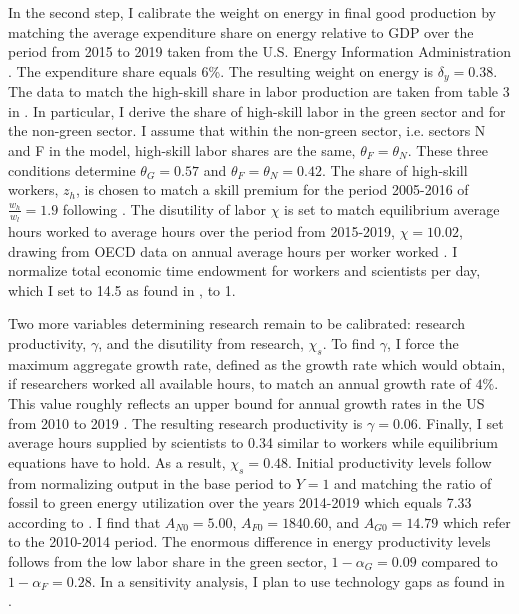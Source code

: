 In the second step, I calibrate the weight on energy in final good production by matching the average expenditure share on energy relative to GDP over the period from 2015 to 2019 taken from the U.S. Energy Information Administration \citep[][Table 1.7]{EIAEnergy}. The expenditure share equals 6\%. The resulting weight on energy is $\delta_y=0.38$. %
 The data to match the high-skill share in labor production are taken from table 3 in \cite{Consoli2016DoCapital}. In particular, I derive the share of high-skill labor in the green sector and for the non-green sector. I assume that within the non-green sector, i.e. sectors N and F in the model, high-skill labor shares are the same, $\theta_F=\theta_N$.  These three conditions determine $\theta_G=0.57$ and $\theta_F=\theta_N=0.42$. The share of high-skill workers, $z_h$, is chosen to match a skill premium for the period 2005-2016 of $\frac{w_h}{w_l}=1.9$ following \cite{Slavik2020WagePremium}. The disutility of labor $\chi$ is set to match equilibrium average hours worked to average hours over the period from 2015-2019, $\chi=10.02$, drawing from OECD data on annual average hours per worker worked \citep{OECDHoursworked}. I normalize total economic time endowment for workers and scientists per day, which I set to 14.5 as found in \cite{Jones1993OptimalGrowth}, to 1. 

 Two more variables determining research remain to be calibrated: research productivity, $\gamma$, and the disutility from research, $\chi_s$.
 To find $\gamma$, I force the maximum aggregate growth rate, defined as the growth rate which would obtain, if researchers worked all available hours, to match an annual growth rate of $4\%$. This value roughly reflects an upper bound for annual growth rates in the US from 2010 to 2019 \citep[compare][]{OECDGDP}.
  The resulting research productivity is $\gamma = 0.06$.  Finally, I set average hours supplied by scientists to 0.34 similar to workers while equilibrium equations have to hold. As a result,  $\chi_s=0.48$. Initial productivity levels follow from normalizing output in the base period to $Y=1$ and matching the ratio of fossil to green energy utilization over the years 2014-2019 which equals 7.33 according to \cite[][Table 1.3]{EIAEnergy}. I find that $A_{N0}=5.00$, $A_{F0}=1840.60$, and $A_{G0}=14.79$ which refer to the 2010-2014 period. The enormous difference in energy productivity levels follows from the low labor share in the green sector, $1-\alpha_G=0.09$ compared to $1-\alpha_F= 0.28$. In a sensitivity analysis, I plan to use technology gaps as found in \cite{Fried2018ClimateAnalysis}. 
  
